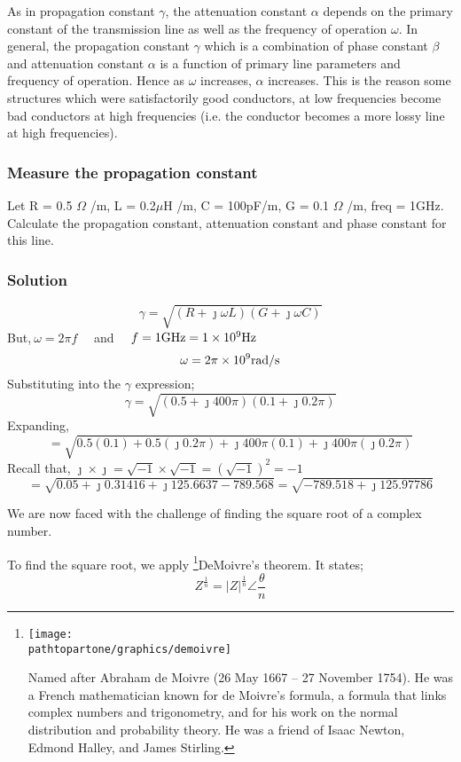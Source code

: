 As in propagation constant $\gamma$, the attenuation constant $\alpha$ depends on the primary constant of the transmission line as well as the frequency of operation $\omega$. In general, the propagation constant $\gamma$ which is a combination of phase constant $\beta$ and attenuation constant $\alpha$ is a function of primary line parameters and frequency of operation. Hence as $\omega$ increases, $\alpha$ increases. This is the reason some structures which were satisfactorily good conductors, at low frequencies become bad conductors at high frequencies (i.e. the conductor becomes a more lossy line at high frequencies).

\begin{exmp}
\subsubsection*{Measure the propagation constant}
Let R = 0.5 $\Omega$ /m, L = 0.2$\mu$H /m, C = 100pF/m, G = 0.1 $\Omega$ /m, freq = 1GHz. Calculate the propagation constant, attenuation constant and phase constant for this line.

\subsubsection*{Solution}
\[ \gamma = \sqrt{(R+\jmath\omega L)(G + \jmath\omega C)}\]
But,$ \ \omega = 2\pi f\quad$ and $\quad f = 1\textnormal{GHz} = 1 \times 10^9 \textnormal{Hz} $ 
\[\omega = 2\pi \times 10^9\textnormal{rad/s}\]
Substituting into the $ \gamma $ expression;
\[\gamma = \sqrt{(0.5 + \jmath 400\pi)(0.1 + \jmath 0.2\pi)}\]
Expanding,
\[ = \sqrt{0.5(0.1) + 0.5(\jmath 0.2\pi) + \jmath 400\pi(0.1) + \jmath 400\pi(\jmath 0.2\pi)}\]
Recall that, $ \jmath \times \jmath = \sqrt{-1} \times \sqrt{-1} = (\sqrt{-1})^2 = -1 $
\begin{dmath*}
=\sqrt{0.05 + \jmath 0.31416 +\jmath 125.6637 - 789.568}
= \sqrt{-789.518 + \jmath 125.97786}
\end{dmath*}

We are now faced with the challenge of finding the square root of a complex number.

To find the square root, we apply \footnote{
\texttt{[image: \\pathtopartone/graphics/demoivre]}

Named after Abraham de Moivre (26 May 1667 – 27 November 1754). He was a French mathematician known for de Moivre's formula, a formula that links complex numbers and trigonometry, and for his work on the normal distribution and probability theory. He was a friend of Isaac Newton, Edmond Halley, and James Stirling.
}DeMoivre's theorem. It states; 
\begin{equation*}
Z^{\frac{1}{n}} = |Z|^{\frac{1}{n}}\angle\frac{\theta}{n}
\end{equation*}


\end{exmp}
